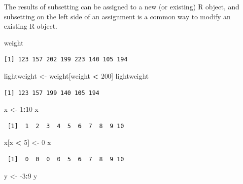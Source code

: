 \documentclass[
]{krantz}
\makeatletter
\newenvironment{Shaded}{\begin{snugshade}}{\end{snugshade}}
\newcommand{\DecValTok}[1]{\textcolor[rgb]{0.06,0.06,0.06}{#1}}
\newcommand{\NormalTok}[1]{#1}
\newcommand{\OperatorTok}[1]{\textcolor[rgb]{0.43,0.43,0.43}{\textbf{#1}}}
\newcommand{\StringTok}[1]{\textcolor[rgb]{0.5,0.5,0.5}{#1}}
\newenvironment{kframe}{%
\medskip{}
\setlength{\fboxsep}{.8em}
 \def\at@end@of@kframe{}%
 \ifinner\ifhmode%
  \def\at@end@of@kframe{\end{minipage}}%
  \begin{minipage}{\columnwidth}%
 \fi\fi%
 \def\FrameCommand##1{\hskip\@totalleftmargin \hskip-\fboxsep
 \colorbox{shadecolor}{##1}\hskip-\fboxsep
     \hskip-\linewidth \hskip-\@totalleftmargin \hskip\columnwidth}%
 \MakeFramed {\advance\hsize-\width
   \@totalleftmargin\z@ \linewidth\hsize
   \@setminipage}}%
 {\par\unskip\endMakeFramed%
 \at@end@of@kframe}
\renewenvironment{Shaded}{\begin{kframe}}{\end{kframe}}
\makeatother
\begin{document}
The results of subsetting can be assigned to a new (or existing) R object, and subsetting on the left side of an assignment is a common way to modify an existing R object.

\begin{Shaded}
\begin{Highlighting}[]
\NormalTok{weight}
\end{Highlighting}
\end{Shaded}

\begin{verbatim}
[1] 123 157 202 199 223 140 105 194
\end{verbatim}

\begin{Shaded}
\begin{Highlighting}[]
\NormalTok{lightweight \textless{}{-}}\StringTok{ }\NormalTok{weight[weight }\OperatorTok{\textless{}}\StringTok{ }\DecValTok{200}\NormalTok{]}
\NormalTok{lightweight}
\end{Highlighting}
\end{Shaded}

\begin{verbatim}
[1] 123 157 199 140 105 194
\end{verbatim}

\begin{Shaded}
\begin{Highlighting}[]
\NormalTok{x \textless{}{-}}\StringTok{ }\DecValTok{1}\OperatorTok{:}\DecValTok{10}
\NormalTok{x}
\end{Highlighting}
\end{Shaded}

\begin{verbatim}
 [1]  1  2  3  4  5  6  7  8  9 10
\end{verbatim}

\begin{Shaded}
\begin{Highlighting}[]
\NormalTok{x[x }\OperatorTok{\textless{}}\StringTok{ }\DecValTok{5}\NormalTok{] \textless{}{-}}\StringTok{ }\DecValTok{0}
\NormalTok{x}
\end{Highlighting}
\end{Shaded}

\begin{verbatim}
 [1]  0  0  0  0  5  6  7  8  9 10
\end{verbatim}

\begin{Shaded}
\begin{Highlighting}[]
\NormalTok{y \textless{}{-}}\StringTok{ }\DecValTok{{-}3}\OperatorTok{:}\DecValTok{9}
\NormalTok{y}
\end{Highlighting}
\end{Shaded}
\end{document}
